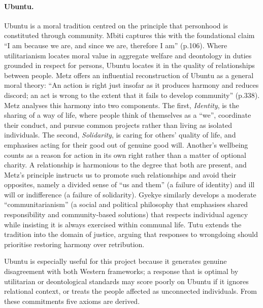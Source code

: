 \documentclass[10pt,twocolumn,a4paper]{article}
\begin{document}
\paragraph{Ubuntu.} Ubuntu is a moral tradition centred on the
principle that personhood is constituted through community. Mbiti
\cite{mbiti1969} captures this with the foundational claim ``I am because we are, and
since we are, therefore I am'' (p.106). Where utilitarianism locates moral value
in aggregate welfare and deontology in duties grounded in respect for persons,
Ubuntu locates it in the quality of relationships between people. Metz
\cite{metz2007} offers an influential reconstruction of Ubuntu as a general moral
theory: ``An action is right just insofar as it produces harmony and reduces
discord; an act is wrong to the extent that it fails to develop community''
(p.338). Metz \cite{metz2011} analyses this harmony into two components. The
first, \emph{Identity}, is the sharing of a way of life, where people think of themselves as a
``we'', coordinate their conduct, and pursue common projects rather than living
as isolated individuals. The second, \emph{Solidarity}, is caring for others' quality of life, and emphasises
acting for their good out of genuine good will. Another's wellbeing counts
as a reason for action in its own right rather than a matter of optional charity.
A relationship is harmonious to the degree that both are present, and Metz's
principle instructs us to promote such relationships and avoid their opposites,
namely a divided sense of ``us and them'' (a failure of identity) and ill will or
indifference (a failure of solidarity). Gyekye \cite{gyekye1997} similarly develops a moderate
``communitarianism'' (a social and political philosophy that emphasises shared
responsibility and community-based solutions)
that respects individual agency while insisting it is always exercised within
communal life. Tutu \cite{tutu1999} extends the tradition into the domain of
justice, arguing that responses to wrongdoing should prioritise restoring harmony
over retribution. 

Ubuntu is especially useful for this project
because it generates genuine disagreement with both Western frameworks; a
response that is optimal by utilitarian or deontological standards may score
poorly on Ubuntu if it ignores relational context, or treats the people affected
as unconnected individuals. From these commitments five axioms are derived.
\end{document}
